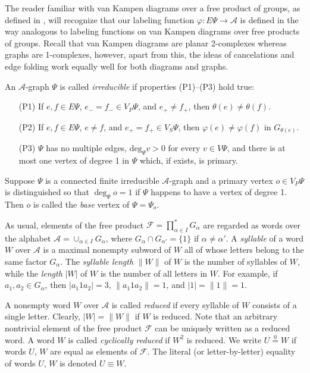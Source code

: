 \documentclass[10pt, reqno]{amsart}
\numberwithin{equation}{section}
\begin{document}
The reader familiar with  van Kampen diagrams over a free product of groups,
as defined in \cite{LS}, will recognize that our labeling function ${\varphi} : E\Psi \to {\mathcal{A}} $  is defined in the way analogous to labeling functions on van Kampen diagrams over free products of groups. Recall that van Kampen diagrams are planar 2-complexes whereas  graphs are 1-complexes, however, apart from this, the ideas of cancelations and edge folding  work equally well for both diagrams and  graphs.

An ${\mathcal{A}}$-graph $\Psi$ is called {\em irreducible} if  properties (P1)--(P3) hold true:
\begin{enumerate}
\item[(P1)] If $e, f \in E \Psi$,  $e_- = f_- \in  V_P \Psi$, and $e_+ \ne f_+$, then   ${\theta}(e) \ne {\theta}(f)$.
\item[(P2)] If $e, f \in E \Psi$,  $e \ne f$, and $e_+= f_+ \in V_S \Psi$, then  ${\varphi}(e) \ne  {\varphi}(f)$ in $G_{{\theta}(e)}$.
\item[(P3)] $\Psi$ has no multiple edges, $\mbox{deg}_\Psi v >0$ for every $v \in V\Psi$,
  and there is at most one vertex of degree 1 in $\Psi$ which, if exists, is primary.
    \end{enumerate}

Suppose $\Psi$ is a connected  finite
irreducible ${\mathcal{A}}$-graph and a primary vertex $o \in V_P\Psi$ is distinguished so that $\deg_\Psi o =1$
if $\Psi$ happens to have a vertex of degree 1. Then  $o$ is called the {\em base} vertex of $\Psi = \Psi_o$.
\medskip

As usual, elements of the free product  ${\mathcal{F}} = \prod_{\alpha \in I}^* G_\alpha$
are regarded  as words over the alphabet ${\mathcal{A}} = \cup_{{\alpha} \in I} G_{\alpha}$, where
$G_{\alpha} \cap G_{{\alpha}'} =\{ 1\}$ if ${\alpha} \ne {\alpha}'$.
A {\em syllable} of a word $W$ over ${\mathcal{A}}$ is a maximal nonempty subword of $W$
all of whose letters belong to the same factor $G_{\alpha}$. The {\em syllable length} $\| W \|$ of $W$
is the number of syllables
of $W$, while the {\em length} $|W|$ of $W$ is the number of all
letters in $W$. For example, if $a_1, a_2 \in G_{\alpha}$, then $| a_1 1 a_2 | = 3$, $\| a_1 1 a_2 \| = 1$, and
$| 1| = \| 1 \| = 1$.

A nonempty word $W$ over   ${\mathcal{A}} $ is called {\em reduced} if every
syllable of $W$ consists of a single letter.
Clearly, $|W| = \|
W \|$ if $W$ is reduced. Note that an arbitrary nontrivial element of the
free product ${\mathcal{F}}$  can  be uniquely
written as a reduced word. A word $W$  is called {\em cyclically reduced} if $W^2$ is reduced.
We write $U \overset 0 = W$ if words $U$, $W$
are equal as elements of ${\mathcal{F}}$. The
literal (or letter-by-letter) equality of words $U$, $W$ is denoted $U \equiv W$.
\end{document}
